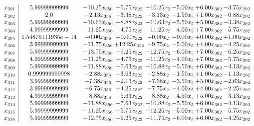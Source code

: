 \documentclass[8pt]{article}
\begin{document}
\[\begin{array}{c| c c@{\hskip 2pt} c@{\hskip 2pt} c@{\hskip 2pt} c@{\hskip 2pt} c@{\hskip 2pt} c@{\hskip 2pt} }
 x_{301}   &  5.99999999999 & -10.25 x_{356} & +  5.75 x_{322} & -10.25 x_{2} & -5.00 x_{5} & +  6.00 x_{382} & -3.75 x_{202}\\
 x_{302}   &  2.0 & -2.13 x_{356} & +  3.38 x_{322} & -3.13 x_{2} & -1.50 x_{5} & +  1.00 x_{382} & -0.88 x_{202}\\
 x_{303}   &  5.99999999999 & -10.63 x_{356} & +  8.88 x_{322} & -10.63 x_{2} & -5.50 x_{5} & +  5.00 x_{382} & -3.38 x_{202}\\
 x_{304}   &  4.99999999999 & -11.25 x_{356} & +  4.75 x_{322} & -11.25 x_{2} & -4.00 x_{5} & +  7.00 x_{382} & -5.75 x_{202}\\
 x_{305}   &  1.54876111935e-14 & -0.00 x_{356} & +  0.00 x_{322} & -0.00 x_{2} & -0.00 x_{5} & +  0.00 x_{382} & +  1.00 x_{202}\\
 x_{306}   &  3.99999999999 & -11.75 x_{356} & + 12.25 x_{322} & -9.75 x_{2} & -5.00 x_{5} & +  4.00 x_{382} & -4.25 x_{202}\\
 x_{307}   &  5.99999999999 & -13.75 x_{356} & +  9.25 x_{322} & -12.75 x_{2} & -6.00 x_{5} & +  7.00 x_{382} & -6.25 x_{202}\\
 x_{308}   &  4.99999999999 & -11.25 x_{356} & +  4.75 x_{322} & -11.25 x_{2} & -4.00 x_{5} & +  7.00 x_{382} & -5.75 x_{202}\\
 x_{309}   &  5.99999999999 & -11.88 x_{356} & +  7.63 x_{322} & -10.88 x_{2} & -5.50 x_{5} & +  6.00 x_{382} & -4.13 x_{202}\\
 x_{310}   &  0.999999999998 & -2.88 x_{356} & +  3.63 x_{322} & -2.88 x_{2} & -1.50 x_{5} & +  1.00 x_{382} & -1.13 x_{202}\\
 x_{311}   &  3.99999999999 & -7.38 x_{356} & +  2.13 x_{322} & -7.38 x_{2} & -3.50 x_{5} & +  5.00 x_{382} & -2.63 x_{202}\\
 x_{312}   &  3.99999999999 & -6.75 x_{356} & +  4.25 x_{322} & -7.75 x_{2} & -4.00 x_{5} & +  4.00 x_{382} & -2.25 x_{202}\\
 x_{313}   &  4.99999999999 & -8.88 x_{356} & +  5.63 x_{322} & -8.88 x_{2} & -4.50 x_{5} & +  5.00 x_{382} & -3.13 x_{202}\\
 x_{314}   &  5.99999999999 & -11.88 x_{356} & +  7.63 x_{322} & -10.88 x_{2} & -5.50 x_{5} & +  6.00 x_{382} & -4.13 x_{202}\\
 x_{315}   &  5.99999999999 & -11.25 x_{356} & +  5.75 x_{322} & -12.25 x_{2} & -5.00 x_{5} & +  7.00 x_{382} & -5.75 x_{202}\\
 x_{316}   &  5.99999999999 & -12.75 x_{356} & +  9.25 x_{322} & -11.75 x_{2} & -6.00 x_{5} & +  6.00 x_{382} & -4.25 x_{202}\\

\end{array}\]
\end{document}
